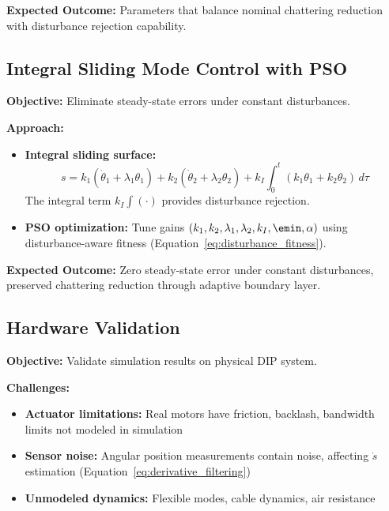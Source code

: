 \textbf{Expected Outcome:} Parameters that balance nominal chattering reduction with disturbance rejection capability.

\subsection{Integral Sliding Mode Control with PSO}
\label{subsec:integral_smc_pso}

\textbf{Objective:} Eliminate steady-state errors under constant disturbances.

\textbf{Approach:}
\begin{itemize}
    \item \textbf{Integral sliding surface:}
    \begin{equation}
    \label{eq:integral_sliding_surface}
    s = k_1(\dot{\theta}_1 + \lambda_1\theta_1) + k_2(\dot{\theta}_2 + \lambda_2\theta_2) + k_I \int_{0}^{t} (k_1\theta_1 + k_2\theta_2) \, d\tau
    \end{equation}
    The integral term $k_I \int (\cdot)$ provides disturbance rejection.

    \item \textbf{PSO optimization:} Tune gains $(k_1, k_2, \lambda_1, \lambda_2, k_I, \emin, \alpha)$ using disturbance-aware fitness (Equation~\ref{eq:disturbance_fitness}).
\end{itemize}

\textbf{Expected Outcome:} Zero steady-state error under constant disturbances, preserved chattering reduction through adaptive boundary layer.

\subsection{Hardware Validation}
\label{subsec:hardware_validation}

\textbf{Objective:} Validate simulation results on physical DIP system.

\textbf{Challenges:}
\begin{itemize}
    \item \textbf{Actuator limitations:} Real motors have friction, backlash, bandwidth limits not modeled in simulation
    \item \textbf{Sensor noise:} Angular position measurements contain noise, affecting $\dot{s}$ estimation (Equation~\ref{eq:derivative_filtering})
    \item \textbf{Unmodeled dynamics:} Flexible modes, cable dynamics, air resistance
\end{itemize}

